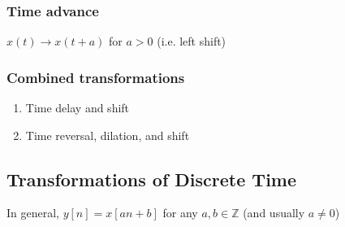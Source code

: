     \subsubsection{Time advance}
    \begin{definition}
        $x(t) \rightarrow x(t + a)$ for $a>0$ (i.e. left shift)
    \end{definition}

    \begin{example}
    \end{example}

    \subsubsection{Combined transformations}
    \begin{example}
        \begin{enumerate}
            \item Time delay and shift
            \item Time reversal, dilation, and shift
        \end{enumerate}
    \end{example}

\subsection{Transformations of Discrete Time}
    In general, $y[n] = x[an+b]$ for any $a,b \in \mathbb{Z}$ (and usually $a \neq 0$)
    
    \begin{example}
    \end{example}

